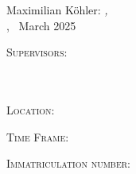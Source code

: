 
\thispagestyle{empty}

\hfill

\vfill

    Maximilian Köhler: \textit{\titel,} \\
    \arbeit, \textcopyright~March 2025

    \bigskip

    \textsc{Supervisors}: \\
    \betreuer \\
    \betreuerzwei \\ 
    \gutachter

    \medskip

    \textsc{Location}: \\
    \abgabeort

    \medskip

    \textsc{Time Frame}: \\
    \zeitraum

    \medskip
    \textsc{Immatriculation number}: \\
    \matrikelnr


